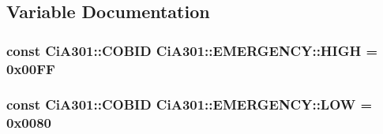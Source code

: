 \subsection{Variable Documentation}
\hypertarget{namespace_ci_a301_1_1_e_m_e_r_g_e_n_c_y_a86da6584e2722e7e1b2c0fc763c06754}{}
\subsubsection[{H\+I\+G\+H}]{\setlength{\rightskip}{0pt plus 5cm}const {\bf Ci\+A301\+::\+C\+O\+B\+I\+D} Ci\+A301\+::\+E\+M\+E\+R\+G\+E\+N\+C\+Y\+::\+H\+I\+G\+H = 0x00\+F\+F}\label{namespace_ci_a301_1_1_e_m_e_r_g_e_n_c_y_a86da6584e2722e7e1b2c0fc763c06754}
\hypertarget{namespace_ci_a301_1_1_e_m_e_r_g_e_n_c_y_afd634e483d0eedb29789234d50cb6895}{}
\subsubsection[{L\+O\+W}]{\setlength{\rightskip}{0pt plus 5cm}const {\bf Ci\+A301\+::\+C\+O\+B\+I\+D} Ci\+A301\+::\+E\+M\+E\+R\+G\+E\+N\+C\+Y\+::\+L\+O\+W = 0x0080}\label{namespace_ci_a301_1_1_e_m_e_r_g_e_n_c_y_afd634e483d0eedb29789234d50cb6895}
